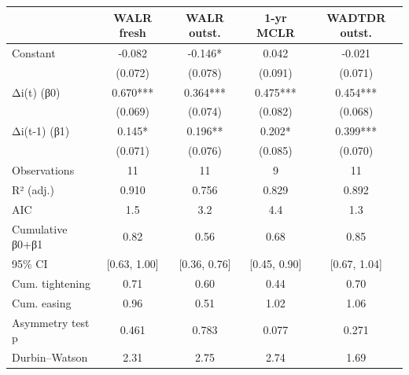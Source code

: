 \begin{tabular}{lcccc}
\toprule
 & WALR fresh & WALR outst. & 1-yr MCLR & WADTDR outst. \\
\midrule
Constant & -0.082 & -0.146* & 0.042 & -0.021 \\
   & (0.072) & (0.078) & (0.091) & (0.071) \\
Δi(t)  (β0) & 0.670*** & 0.364*** & 0.475*** & 0.454*** \\
     & (0.069) & (0.074) & (0.082) & (0.068) \\
Δi(t-1)  (β1) & 0.145* & 0.196** & 0.202* & 0.399*** \\
       & (0.071) & (0.076) & (0.085) & (0.070) \\
Observations & 11 & 11 & 9 & 11 \\
R² (adj.) & 0.910 & 0.756 & 0.829 & 0.892 \\
AIC & 1.5 & 3.2 & 4.4 & 1.3 \\
Cumulative β0+β1 & 0.82 & 0.56 & 0.68 & 0.85 \\
  95\% CI & [0.63, 1.00] & [0.36, 0.76] & [0.45, 0.90] & [0.67, 1.04] \\
Cum. tightening & 0.71 & 0.60 & 0.44 & 0.70 \\
Cum. easing & 0.96 & 0.51 & 1.02 & 1.06 \\
Asymmetry test p & 0.461 & 0.783 & 0.077 & 0.271 \\
Durbin–Watson & 2.31 & 2.75 & 2.74 & 1.69 \\
\bottomrule
\end{tabular}
